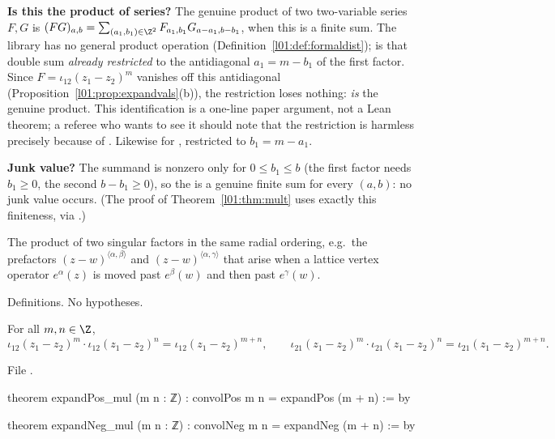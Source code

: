 \begin{dictionary}
\textbf{Is this the product of series?} The genuine product of two two-variable series $F,G$ is
$(FG)_{a,b} = \sum_{(a_1,b_1)\in\Z^2}F_{a_1,b_1}G_{a-a_1,b-b_1}$, when this is a finite sum. The library has no
general product operation (Definition~\ref{l01:def:formaldist});  is that double sum
\emph{already restricted} to the antidiagonal $a_1 = m-b_1$ of the first factor. Since
$F = \iota_{12}(z_1-z_2)^m$ vanishes off this antidiagonal (Proposition~\ref{l01:prop:expandvals}(b)), the
restriction loses nothing:  \emph{is} the genuine product. This identification is a
one-line paper argument, not a Lean theorem; a referee who wants to see it should note that the restriction
is harmless precisely because of . Likewise for , restricted to
$b_1 = m-a_1$.

\textbf{Junk value?} The summand is nonzero only for $0\le b_1\le b$ (the first factor needs $b_1\ge0$, the second
$b-b_1\ge0$), so the  is a genuine finite sum for every $(a,b)$: no junk value occurs. (The proof of
Theorem~\ref{l01:thm:mult} uses exactly this finiteness, via .)
\end{dictionary}

\begin{physics}
The product of two singular factors in the same radial ordering, e.g.\ the prefactors
$(z-w)^{\langle\alpha,\beta\rangle}$ and $(z-w)^{\langle\alpha,\gamma\rangle}$ that arise when a lattice vertex operator
$e^{\alpha}(z)$ is moved past $e^{\beta}(w)$ and then past $e^{\gamma}(w)$.
\end{physics}

\begin{status}
Definitions. No hypotheses.
\end{status}

\begin{theorem}\label{l01:thm:mult}
For all $m,n\in\Z$,
\begin{equation*}
  \iota_{12}(z_1-z_2)^m\cdot\iota_{12}(z_1-z_2)^n = \iota_{12}(z_1-z_2)^{m+n},\qquad
  \iota_{21}(z_1-z_2)^m\cdot\iota_{21}(z_1-z_2)^n = \iota_{21}(z_1-z_2)^{m+n}.
\end{equation*}
\end{theorem}

\noindent File .
\begin{leancode}
theorem expandPos_mul (m n : ℤ) : convolPos m n = expandPos (m + n) := by

theorem expandNeg_mul (m n : ℤ) : convolNeg m n = expandNeg (m + n) := by
\end{leancode}


